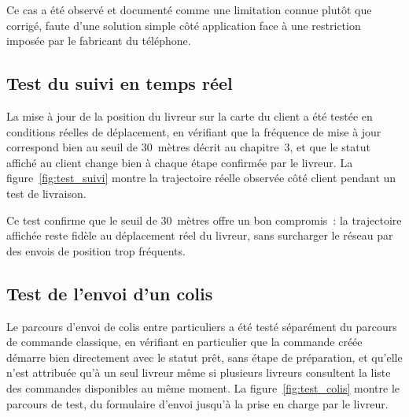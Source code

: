 \documentclass[12pt,fleqn,a4paper]{report}
\begin{document}
\begin{justify}
Ce cas a été observé et documenté comme une limitation connue plutôt que corrigé, faute d'une solution simple côté application face à une restriction imposée par le fabricant du téléphone.

\subsection{Test du suivi en temps réel}

La mise à jour de la position du livreur sur la carte du client a été testée en conditions réelles de déplacement, en vérifiant que la fréquence de mise à jour correspond bien au seuil de 30~mètres décrit au chapitre~3, et que le statut affiché au client change bien à chaque étape confirmée par le livreur. La figure~\ref{fig:test_suivi} montre la trajectoire réelle observée côté client pendant un test de livraison.


Ce test confirme que le seuil de 30~mètres offre un bon compromis~: la trajectoire affichée reste fidèle au déplacement réel du livreur, sans surcharger le réseau par des envois de position trop fréquents.

\subsection{Test de l'envoi d'un colis}

Le parcours d'envoi de colis entre particuliers a été testé séparément du parcours de commande classique, en vérifiant en particulier que la commande créée démarre bien directement avec le statut prêt, sans étape de préparation, et qu'elle n'est attribuée qu'à un seul livreur même si plusieurs livreurs consultent la liste des commandes disponibles au même moment. La figure~\ref{fig:test_colis} montre le parcours de test, du formulaire d'envoi jusqu'à la prise en charge par le livreur.



\end{justify}
\end{document}

